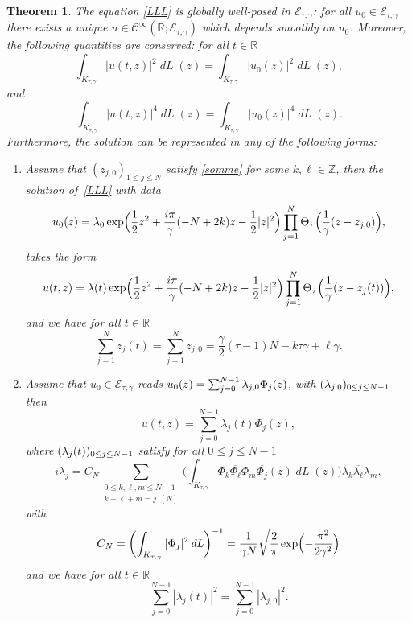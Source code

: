 \documentclass[JEP,XML,SOM,Unicode,NoFloatCountersInSection,published]{cedram}
\DeclareMathOperator{\dL}{\mathit{dL}}
\newtheorem{theorem}{Theorem}[section]
\theoremstyle{definition}
\let\EE\exp
\let\dis\relax
\let\ov\overline
\newcommand\R{\mathbb R}
\newcommand\Z{\mathbb Z}
\begin{document}
\begin{theorem}\label{prop42}
The equation \eqref{LLL} is globally well-posed in $ \mathcal{E}_{\tau,\gamma}$: for all $u_0 \in \mathcal{E}_{\tau,\gamma}$ there exists a unique $u \in \mathcal{C}^{\infty}(\R ; \mathcal{E}_{\tau,\gamma})$ which depends smoothly on $u_0$. Moreover, the following quantities are conserved: for all $t\in \R$
\begin{equation*}
\int_{K_{\tau,\gamma}}|u(t,z)|^{2}\dL(z)= \int_{K_{\tau,\gamma}}|u_0(z)|^{2}\dL(z),
\end{equation*}
and
\begin{equation*}
\int_{K_{\tau,\gamma}}|u(t,z)|^{4}\dL(z)=\int_{K_{\tau,\gamma}}|u_0(z)|^{4}\dL(z).
\end{equation*}
Furthermore, the solution can be represented in any of the following forms:
\begin{enumerate}
\item Assume that $(z_{j,0})_{1\leq j\leq N}$ satisfy \eqref{somme} for some $k, \ell \in \Z$, then the solution of~\eqref{LLL} with data
\[
u_0(z) = \lambda_0 \EE\Bigl(\frac12 z^2 +\frac{i\pi } {\gamma} (-N+2 k) z - \frac12 |z|^2\Bigr) \prod_{j=1}^N\Theta_{\tau}\Bigl(\frac{1}{\gamma}(z-z_{j,0})\Bigr),
\]
takes the form
\[
u(t,z) = \lambda(t) \EE\Bigl(\frac12 z^2 +\frac{i\pi } {\gamma} (-N+2 k) z - \frac12 |z|^2\Bigr)\prod_{j=1}^N\Theta_{\tau}\Bigl(\frac{1}{\gamma}(z-z_{j}(t))\Bigr),
\]
and we have for all $t \in \R$
\begin{equation}\label{somme1}
\sum_{j=1}^Nz_j(t)=\sum_{j=1}^Nz_{j,0} = \frac{\gamma}{2} (\tau - 1) N - k \tau \gamma + \ell \gamma.
\end{equation}
\item Assume that $u_0 \in \mathcal{E}_{\tau,\gamma}$ reads $\dis u_0(z) =\sum_{j=0}^{N-1} \lambda_{j,0} \Phi_j(z)$, with $\dis (\lambda_{j,0})_{0 \leq j \leq N-1}$ then
\[
u(t,z) =\sum_{j=0}^{N-1} \lambda_j(t) \Phi_j(z),
\]
where $\dis (\lambda_{j}(t))_{0 \leq j \leq N-1}$ satisfy for all $0\leq j\leq N-1$
\begin{equation}\label{systL}
i\dot{\lambda}_j=C_N\sum_{\substack {0\leq k, \ell, m\leq N-1\\ k-\ell+m=j\;\;[N]}}\biggl(\int_{K_{\tau,\gamma}} \Phi_{k}\ov{\Phi_{\ell}} \Phi_{m}\ov{\Phi_{j}}(z)\dL(z)\biggr) \lambda_{k}\ov{\lambda_{\ell}}\lambda_{m},
\end{equation}
with
\[
\dis C_N= \biggl(\int_{K_{\tau, \gamma}}|\Phi_{j}|^{2}\dL \biggr)^{-1}=\frac1{\gamma N} \sqrt{\frac{2}{ {\pi}}} \EE\Bigl(- \frac{\pi^2}{2\gamma^2}\Bigr)
\]
and we have for all $t \in \R$
\begin{equation*}
\sum_{j=0}^{N-1}|\lambda_j(t)|^2= \sum_{j=0}^{N-1}|\lambda_{j,0}|^2.
\end{equation*}
\end{enumerate}
\end{theorem}
\end{document}
